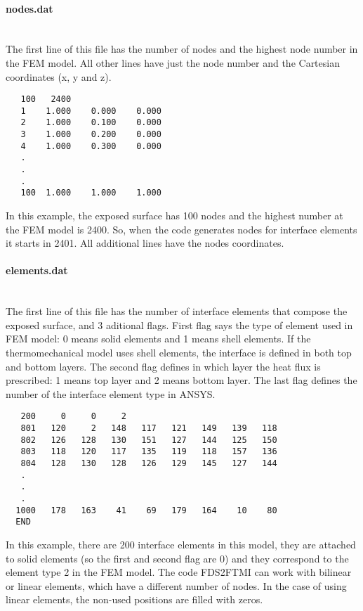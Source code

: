 \documentclass[11pt]{book}
\begin{document}
\paragraph{nodes.dat}~\\
The first line of this file has the number of nodes and the highest node number in the FEM model. All other lines have just the node number and the Cartesian coordinates (x, y and z). 
\begin{verbatim}
   100   2400
   1    1.000    0.000    0.000
   2    1.000    0.100    0.000
   3    1.000    0.200    0.000
   4    1.000    0.300    0.000
   .
   .
   .
   100  1.000    1.000    1.000
\end{verbatim}
In this example, the exposed surface has 100 nodes and the highest number at the FEM model is 2400. So, when the code generates nodes for interface elements it starts in 2401. All additional lines have the nodes coordinates.

\paragraph{elements.dat}~\\
The first line of this file has the number of interface elements that compose the exposed surface, and 3 aditional flags. First flag says the type of element used in FEM model: 0 means solid elements and 1 means shell elements. If the thermomechanical model uses shell elements, the interface is defined in both top and bottom layers. The second flag defines in which layer the heat flux is prescribed: 1 means top layer and 2 means bottom layer. The last flag defines the number of the interface element type in A{\footnotesize NSYS}.

\begin{verbatim}
   200     0     0     2
   801   120     2   148   117   121   149   139   118
   802   126   128   130   151   127   144   125   150
   803   118   120   117   135   119   118   157   136
   804   128   130   128   126   129   145   127   144
   .
   .
   .
  1000   178   163    41    69   179   164    10    80
  END
\end{verbatim}
In this example, there are 200 interface elements in this model, they are attached to solid elements (so the first and second flag are 0) and they correspond to the element type 2 in the FEM model. The code FDS2FTMI can work with bilinear or linear elements, which have a different number of nodes. In the case of using linear elements, the non-used positions are filled with zeros. 
\end{document}

